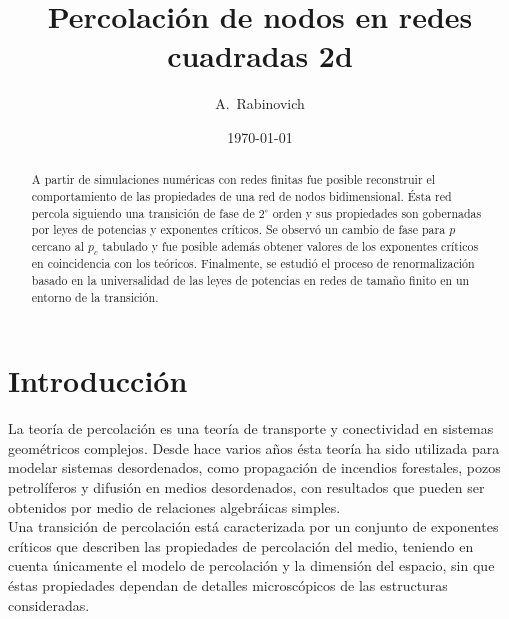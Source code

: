 \documentclass[%
 reprint,
 amsmath,amssymb,
 aps,
spanish]{revtex4-1}
\begin{document}

\title{Percolaci\'on de nodos en redes cuadradas 2d}%

\author{A.~Rabinovich}
%


\date{\today}%

\begin{abstract}
A partir de simulaciones numéricas con redes finitas fue posible reconstruir el comportamiento de las propiedades de una red de nodos bidimensional. Ésta red percola siguiendo una transición de fase de $2^\circ$ orden y sus propiedades son gobernadas por leyes de potencias y exponentes críticos. Se observó un cambio de fase para $p$ cercano al $p_c$ tabulado y fue posible además obtener valores de los exponentes críticos en coincidencia con los teóricos. Finalmente, se estudió el proceso de renormalización basado en la universalidad de las leyes de potencias en redes de tamaño finito en un entorno de la transición.
\end{abstract}


\maketitle


\section{\label{intro}Introducci\'on}
La teoría de percolación es una teoría de transporte y conectividad en sistemas geométricos complejos. Desde hace varios años ésta teoría ha sido utilizada para modelar sistemas desordenados, como propagación de incendios forestales, pozos petrolíferos y difusión en medios desordenados, con resultados que pueden ser obtenidos por medio de relaciones algebráicas simples.\\
Una transición de percolación está caracterizada por un conjunto de exponentes críticos que describen las propiedades de percolación del medio, teniendo en cuenta únicamente el modelo de percolación y la dimensión del espacio, sin que éstas propiedades dependan de detalles microscópicos de las estructuras consideradas. \cite{levinshtein}\cite{stauffer}\cite{havlin}
\end{document}
